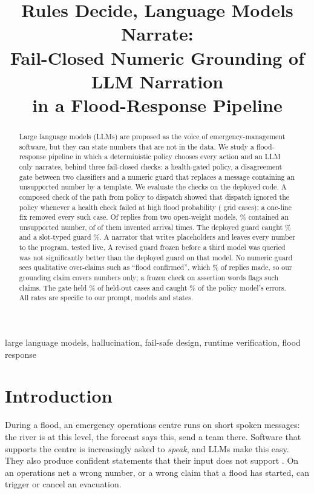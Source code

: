 \documentclass[conference]{IEEEtran}
\begin{document}
\title{Rules Decide, Language Models Narrate:\\
Fail-Closed Numeric Grounding of LLM Narration\\
in a Flood-Response Pipeline}

\author{
}

\maketitle

\begin{abstract}
Large language models (LLMs) are proposed as the voice of emergency-management software, but they can state numbers that are not in the data. We study a flood-response pipeline in which a deterministic policy chooses every action and an LLM only narrates, behind three fail-closed checks: a health-gated policy, a disagreement gate between two classifiers and a numeric guard that replaces a message containing an unsupported number by a template. We evaluate the checks on the deployed code. A composed check of the path from policy to dispatch showed that dispatch ignored the policy whenever a health check failed at high flood probability (\EtoEViolBefore{} grid cases); a one-line fix removed every such case. Of \LiveN{} replies from two open-weight models, \LiveUnsupPct\% contained an unsupported number, \LiveEta{} of \LiveUnsup{} of them invented arrival times. The deployed guard caught \LiveDepRec\% and a slot-typed guard \LiveTypRec\%. A narrator that writes placeholders and leaves every number to the program, tested live, \SlotsAbstract{} A revised guard frozen before a third model was queried was not significantly better than the deployed guard on that model. No numeric guard sees qualitative over-claims such as ``flood confirmed'', which \OcDevPct\% of replies made, so our grounding claim covers numbers only; a frozen check on assertion words flags such claims. The gate held \GateDepHold\% of held-out cases and caught \GtDepRecall\% of the policy model's errors. All rates are specific to our prompt, models and states.
\end{abstract}

\begin{IEEEkeywords}
large language models, hallucination, fail-safe design, runtime verification, flood response
\end{IEEEkeywords}

\section{Introduction}
During a flood, an emergency operations centre runs on short spoken messages: the river is at this level, the forecast says this, send a team there. Software that supports the centre is increasingly asked to \emph{speak}, and LLMs make this easy. They also produce confident statements that their input does not support \cite{Ji2023}. On an operations net a wrong number, or a wrong claim that a flood has started, can trigger or cancel an evacuation.
\end{document}
